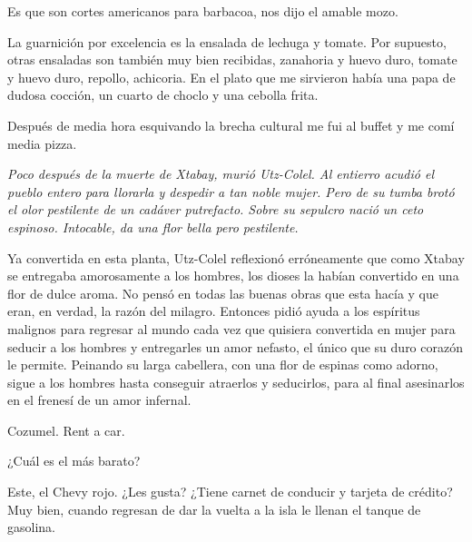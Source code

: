 \documentclass[11pt,twoside,openright,a6paper]{book}
\begin{document}
Es que son cortes americanos para barbacoa, nos dijo el amable mozo.

La guarnición por excelencia es la ensalada de lechuga y tomate. Por
supuesto, otras ensaladas son también muy bien recibidas, zanahoria y huevo
duro, tomate y huevo duro, repollo, achicoria. En el plato que me sirvieron
había una papa de dudosa cocción, un cuarto de choclo y una cebolla frita.

Después de media hora esquivando la brecha cultural me fui al buffet y me
comí media pizza.


\vspace{0.5cm}
\hrulefill\hspace{0.2cm} \decofourleft\decofourright \hspace{0.2cm} \hrulefill
\vspace{0.5cm}

{\em Poco después de la muerte de Xtabay, murió Utz-Colel. Al entierro
acudió el pueblo entero para llorarla y despedir a tan noble mujer. Pero de su
tumba brotó el olor pestilente de un cadáver putrefacto. Sobre su sepulcro
nació un ceto espinoso. Intocable, da una flor bella pero pestilente.

Ya convertida en esta planta, Utz-Colel reflexionó erróneamente que como
Xtabay se entregaba amorosamente a los hombres, los dioses la habían
convertido en una flor de dulce aroma. No pensó en todas las buenas obras
que esta hacía y que eran, en verdad, la razón del milagro. Entonces pidió
ayuda a los espíritus malignos para  regresar al mundo cada vez que quisiera
convertida en mujer para seducir a los hombres y entregarles un amor nefasto,
el único que su duro corazón le permite. Peinando su larga cabellera, con
una flor de espinas como adorno, sigue a los hombres hasta conseguir atraerlos
y seducirlos, para al final asesinarlos en el frenesí de un amor infernal.}


\vspace{0.5cm}
\hrulefill\hspace{0.2cm} \decofourleft\decofourright \hspace{0.2cm} \hrulefill
\vspace{0.5cm}

Cozumel. Rent a car.

¿Cuál es el más barato?

Este, el Chevy rojo. ¿Les gusta? ¿Tiene carnet de conducir y tarjeta de
crédito? Muy bien, cuando regresan de dar la vuelta a la isla le llenan
el tanque de gasolina.
\end{document}
